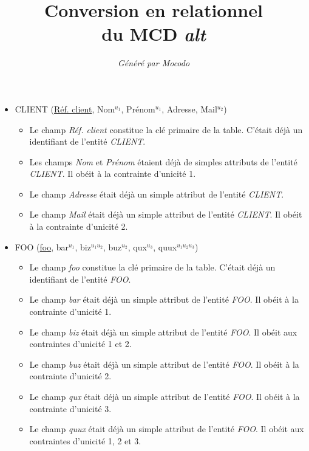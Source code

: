 \documentclass[a4paper]{article}
\title{Conversion en relationnel\\du MCD \emph{alt}}
\author{\emph{Généré par Mocodo}}
\newcommand{\relat}[1]{\textsc{#1}}
\newcommand{\attr}[1]{#1}
\newcommand{\prim}[1]{\uline{#1}}
\begin{document}
\maketitle

\begin{itemize}
  \item \relat{CLIENT} (\prim{Réf. client}, \attr{Nom}$^{u_1}$, \attr{Prénom}$^{u_1}$, \attr{Adresse}, \attr{Mail}$^{u_2}$)
  \begin{itemize}
    \item Le champ \emph{Réf. client} constitue la clé primaire de la table. C'était déjà un identifiant de l'entité \emph{CLIENT}.
    \item Les champs \emph{Nom} et \emph{Prénom} étaient déjà de simples attributs de l'entité \emph{CLIENT}. Il obéit à la contrainte d'unicité 1.
    \item Le champ \emph{Adresse} était déjà un simple attribut de l'entité \emph{CLIENT}.
    \item Le champ \emph{Mail} était déjà un simple attribut de l'entité \emph{CLIENT}. Il obéit à la contrainte d'unicité 2.
  \end{itemize}

  \item \relat{FOO} (\prim{foo}, \attr{bar}$^{u_1}$, \attr{biz}$^{u_1 u_2}$, \attr{buz}$^{u_2}$, \attr{qux}$^{u_3}$, \attr{quux}$^{u_1 u_2 u_3}$)
  \begin{itemize}
    \item Le champ \emph{foo} constitue la clé primaire de la table. C'était déjà un identifiant de l'entité \emph{FOO}.
    \item Le champ \emph{bar} était déjà un simple attribut de l'entité \emph{FOO}. Il obéit à la contrainte d'unicité 1.
    \item Le champ \emph{biz} était déjà un simple attribut de l'entité \emph{FOO}. Il obéit aux contraintes d'unicité 1 et 2.
    \item Le champ \emph{buz} était déjà un simple attribut de l'entité \emph{FOO}. Il obéit à la contrainte d'unicité 2.
    \item Le champ \emph{qux} était déjà un simple attribut de l'entité \emph{FOO}. Il obéit à la contrainte d'unicité 3.
    \item Le champ \emph{quux} était déjà un simple attribut de l'entité \emph{FOO}. Il obéit aux contraintes d'unicité 1, 2 et 3.
  \end{itemize}


\end{itemize}
\end{document}
